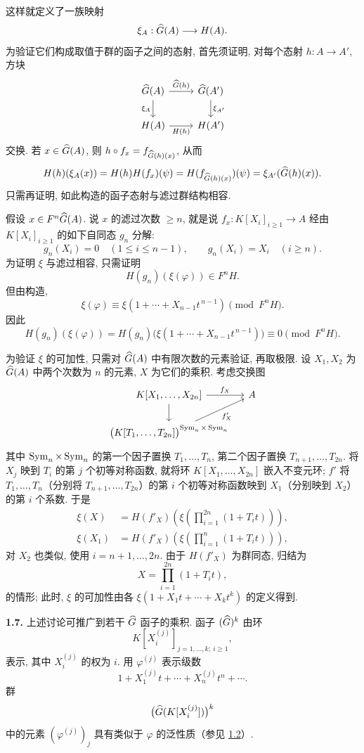 这样就定义了一族映射
\[
  \xi_A:\widehat G(A)\longrightarrow H(A).
\]
为验证它们构成取值于群的函子之间的态射, 首先须证明, 对每个态射 \(h:A\to A'\), 方块
\[
\begin{tikzcd}
\Ghat(A) \arrow[r,"\Ghat(h)"] \arrow[d,"\xi_A"'] &
\Ghat(A') \arrow[d,"\xi_{A'}"]\\
H(A) \arrow[r,"H(h)"'] & H(A')
\end{tikzcd}
\]
交换. 若 \(x\in\widehat G(A)\), 则 \(h\circ f_x=f_{\widehat G(h)(x)}\), 从而
\[
  H(h)(\xi_A(x))=H(h)H(f_x)(\psi)
  =H(f_{\widehat G(h)(x)})(\psi)=\xi_{A'}(\widehat G(h)(x)).
\]
只需再证明, 如此构造的函子态射与滤过群结构相容.

假设 \(x\in F^n\widehat G(A)\). 说 \(x\) 的滤过次数 \(\geq n\), 就是说 %
\(f_x:K[X_i]_{i\geq 1}\to A\) 经由 \(K[X_i]_{i\geq 1}\) 的如下自同态 \(g_n\) 分解:
\[
  g_n(X_i)=0\quad (1\leq i\leq n-1),\qquad
  g_n(X_i)=X_i\quad (i\geq n).
\]
为证明 \(\xi\) 与滤过相容, 只需证明
\[
  H(g_n)(\xi(\varphi))\in F^nH.
\]
但由构造,
\[
  \xi(\varphi)\equiv \xi(1+\cdots+X_{n-1}t^{\,n-1})
  \pmod{F^nH}.
\]
因此
\[
  H(g_n)(\xi(\varphi))
  =H(g_n)\bigl(\xi(1+\cdots+X_{n-1}t^{\,n-1})\bigr)
  \equiv 0\pmod{F^nH}.
\]

为验证 \(\xi\) 的可加性, 只需对 \(\widehat G(A)\) 中有限次数的元素验证, 再取极限. 设 \(X_1,X_2\) 为 \(\widehat G(A)\) 中两个次数为 \(n\) 的元素, \(X\) 为它们的乘积. 考虑交换图
\[
\begin{tikzcd}[column sep=tiny]
K[X_1,\ldots,X_{2n}] \arrow[rr,"f_X"] \arrow[d] && A\\
\bigl(K[T_1,\ldots,T_{2n}]\bigr)^{\Sym_n\times\Sym_n}
\arrow[urr,"f'_X"'] &&
\end{tikzcd}
\]
其中 \(\operatorname{Sym}_n\times\operatorname{Sym}_n\) 的第一个因子置换 \(T_1,\ldots,T_n\), 第二个因子置换 \(T_{n+1},\ldots,T_{2n}\). 将 \(X_j\) 映到 \(T_i\) 的第 \(j\) 个初等对称函数, 就将环 \(K[X_1,\ldots,X_{2n}]\) 嵌入不变元环; \(f'\) 将 \(T_1,\ldots,T_n\)（分别将 \(T_{n+1},\ldots,T_{2n}\)）的第 \(i\) 个初等对称函数映到 \(X_1\)（分别映到 \(X_2\)）的第 \(i\) 个系数. 于是
\[
\begin{aligned}
\xi(X)
&=H(f'_X)\left(\xi\left(\prod_{i=1}^{2n}(1+T_it)\right)\right),\\
\xi(X_1)
&=H(f'_X)\left(\xi\left(\prod_{i=1}^{n}(1+T_it)\right)\right),
\end{aligned}
\]
对 \(X_2\) 也类似, 使用 \(i=n+1,\ldots,2n\). 由于 \(H(f'_X)\) 为群同态, 归结为
\[
  X=\prod_{i=1}^{2n}(1+T_it),
\]
的情形; 此时, \(\xi\) 的可加性由各 \(\xi(1+X_1t+\cdots+X_k t^k)\) 的定义得到.

\textbf{1.7.} 上述讨论可推广到若干 \(\widehat G\) 函子的乘积. 函子 \((\widehat G)^k\) 由环
\[
  K[X_i^{(j)}]_{j=1,\ldots,k;\ i\geq 1},
\]
表示, 其中 \(X_i^{(j)}\) 的权为 \(i\). 用 \(\varphi^{(j)}\) 表示级数
\[
  1+X_1^{(j)}t+\cdots+X_n^{(j)}t^n+\cdots.
\]
群
\[
  \bigl(\widehat G(K[X_i^{(j)}])\bigr)^k
\]
中的元素 \((\varphi^{(j)})_j\) 具有类似于 \(\varphi\) 的泛性质（参见 \hyperlink{sga6.e05.lem.1-2}{1.2}）.

